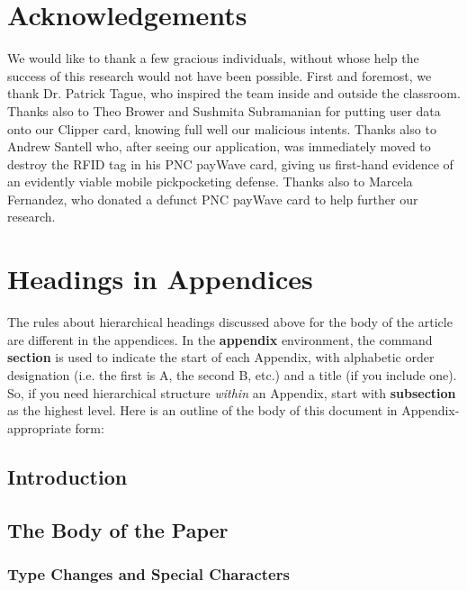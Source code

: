 \documentclass{sig-alternate}
\begin{document}
\section{Acknowledgements}
We would like to thank a few gracious individuals, without whose help the success of this research would not have been possible.  First and foremost, we thank Dr. Patrick Tague, who inspired the team inside and outside the classroom.  Thanks also to Theo Brower and Sushmita Subramanian for putting user data onto our Clipper card, knowing full well our malicious intents.  Thanks also to Andrew Santell who, after seeing our application, was immediately moved to destroy the RFID tag in his PNC payWave card, giving us first-hand evidence of an evidently viable mobile pickpocketing defense.  Thanks also to Marcela Fernandez, who donated a defunct PNC payWave card to help further our research.

%

%
%
\appendix
\section{Headings in Appendices}
The rules about hierarchical headings discussed above for
the body of the article are different in the appendices.
In the \textbf{appendix} environment, the command
\textbf{section} is used to
indicate the start of each Appendix, with alphabetic order
designation (i.e. the first is A, the second B, etc.) and
a title (if you include one).  So, if you need
hierarchical structure
\textit{within} an Appendix, start with \textbf{subsection} as the
highest level. Here is an outline of the body of this
document in Appendix-appropriate form:
\subsection{Introduction}
\subsection{The Body of the Paper}
\subsubsection{Type Changes and  Special Characters}
\end{document}
